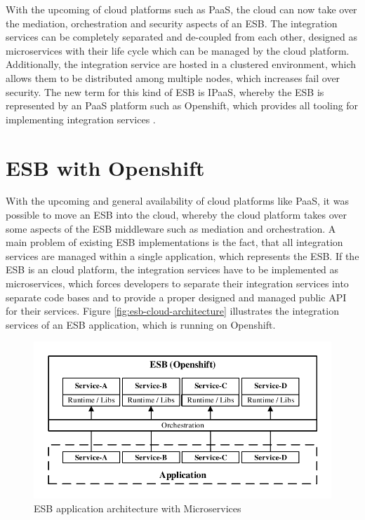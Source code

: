 With the upcoming of cloud platforms such as PaaS, the cloud can now take over the mediation, orchestration and security aspects of an ESB. The integration services can be completely separated and de-coupled from each other, designed as microservices with their life cycle which can be managed by the cloud platform. Additionally, the integration service are hosted in a clustered environment, which allows them to be distributed among multiple nodes, which increases fail over security. The new term for this kind of ESB is IPaaS, whereby the ESB is represented by an PaaS platform such as Openshift, which provides all tooling for implementing integration services \cite{iPaaSP12015, iPaaSP22015}.

\section{ESB with Openshift}
\label{sec:esb-as-cloud}
With the upcoming and general availability of cloud platforms like PaaS, it was possible to move an ESB into the cloud, whereby the cloud platform takes over some aspects of the ESB middleware such as mediation and orchestration. A main problem of existing ESB implementations is the fact, that all integration services are managed within a single application, which represents the ESB. If the ESB is an cloud platform, the integration services have to be implemented as microservices, which forces developers to separate their integration services into separate code bases and to provide a proper designed and managed public API for their services. Figure \vref{fig:esb-cloud-architecture} illustrates the integration services of an ESB application, which is running on Openshift.

\begin{figure}[htbp]
	\centering
	\includegraphics[scale=1]{images/esb-cloud-architecture.pdf}
	\caption{ESB application architecture with Microservices}
	\label{fig:esb-cloud-architecture}
\end{figure} 

